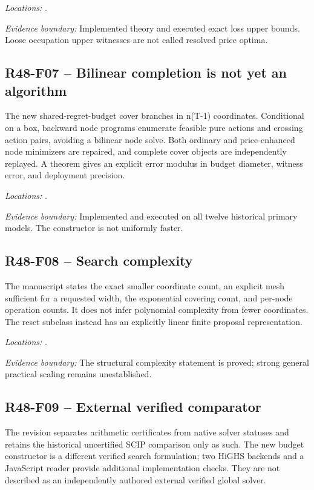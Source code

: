 \noindent\emph{Locations:} .

\noindent\emph{Evidence boundary:} Implemented theory and executed exact loss upper bounds. Loose occupation upper witnesses are not called resolved price optima.

\subsection{R48-F07 -- Bilinear completion is not yet an algorithm}
The new shared-regret-budget cover branches in n(T-1) coordinates. Conditional on a box, backward node programs enumerate feasible pure actions and crossing action pairs, avoiding a bilinear node solve. Both ordinary and price-enhanced node minimizers are repaired, and complete cover objects are independently replayed. A theorem gives an explicit error modulus in budget diameter, witness error, and deployment precision.

\noindent\emph{Locations:} .

\noindent\emph{Evidence boundary:} Implemented and executed on all twelve historical primary models. The constructor is not uniformly faster.

\subsection{R48-F08 -- Search complexity}
The manuscript states the exact smaller coordinate count, an explicit mesh sufficient for a requested width, the exponential covering count, and per-node operation counts. It does not infer polynomial complexity from fewer coordinates. The reset subclass instead has an explicitly linear finite proposal representation.

\noindent\emph{Locations:} .

\noindent\emph{Evidence boundary:} The structural complexity statement is proved; strong general practical scaling remains unestablished.

\subsection{R48-F09 -- External verified comparator}
The revision separates arithmetic certificates from native solver statuses and retains the historical uncertified SCIP comparison only as such. The new budget constructor is a different verified search formulation; two HiGHS backends and a JavaScript reader provide additional implementation checks. They are not described as an independently authored external verified global solver.

